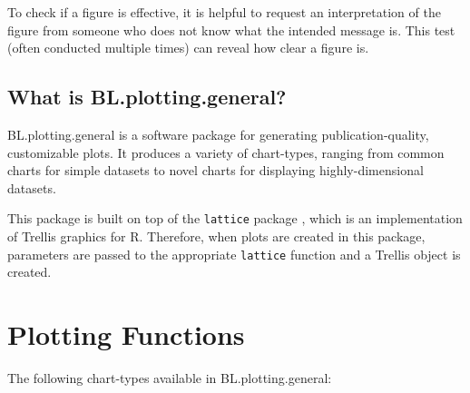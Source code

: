 \documentclass[letterpaper]{article}
\begin{document}
To check if a figure is effective, it is helpful to request an interpretation of the figure from someone who does not know what the intended message is. This test (often conducted multiple times) can reveal how clear a figure is.

\subsection{What is BL.plotting.general?}
BL.plotting.general is a software package for generating publication-quality, customizable plots. It produces a variety of chart-types, ranging from common charts for simple datasets to novel charts for displaying highly-dimensional datasets.

This package is built on top of the \texttt{lattice} package \cite{lattice}, which is an implementation of Trellis graphics for R. Therefore, when plots are created in this package, parameters are passed to the appropriate \texttt{lattice} function and a Trellis object is created. 

\section{Plotting Functions}
The following  chart-types available in BL.plotting.general:
\end{document}
